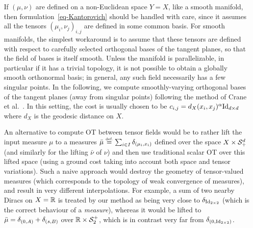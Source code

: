 \begin{rem}
	If $(\mu,\nu)$ are defined on a non-Euclidean space $Y=X$, like a smooth manifold, then formulation~\eqref{eq-Kantorovich} should be handled with care, since it assumes all the tensors $(\mu_i,\nu_j)_{i,j}$ are defined %
	in some common basis. 
	For smooth manifolds, the simplest workaround is to assume that these tensors are defined with respect to carefully selected orthogonal bases of the tangent planes, so that the field of bases is itself smooth. Unless the manifold is parallelizable, in particular if it has a trivial topology, it is not possible to obtain a globally smooth orthonormal basis; in general, any such field necessarily has a few singular points. In the following, we compute smoothly-varying orthogonal bases of the tangent planes (away from singular points) following the method of Crane et al.~. 
	In this setting, the cost is usually chosen to be $c_{i,j} = d_X(x_i,x_j)^\alpha \mathrm{Id}_{d \times d}$ where $d_X$ is the geodesic distance on $X$. 
\end{rem}

\begin{rem}
An alternative to compute OT between tensor fields would be to rather lift the input measure $\mu$ to a measures $\bar \mu \eqdef \sum_{i \in I}  \de_{(\mu_i,x_i)}$ defined over the space $X \times \mathcal{S}_+^d$ (and similarly for the lifting $\bar\nu$ of $\nu$) and then use traditional scalar OT over this lifted space (using a ground cost taking into account both space and tensor variations). 
%
Such a naive approach would destroy the geometry of tensor-valued measures (which corresponds to the topology of weak convergence of measures), and result in very different interpolations. For example, a sum of two nearby Diracs on $X=\mathbb{R}$  
is treated by our method as being very close to $\delta_{\mathrm{Id}_{2\times 2}}$ (which is the correct behaviour of a \emph{measure}), whereas it would be lifted to 
$\bar\mu=\delta_{(0,A)}+\delta_{(s,B)}$ over $\mathbb{R} \times \mathcal{S}_2^+$, which is in contrast very far from $\delta_{(0,\mathrm{Id}_{2\times 2})}$.
\end{rem}


